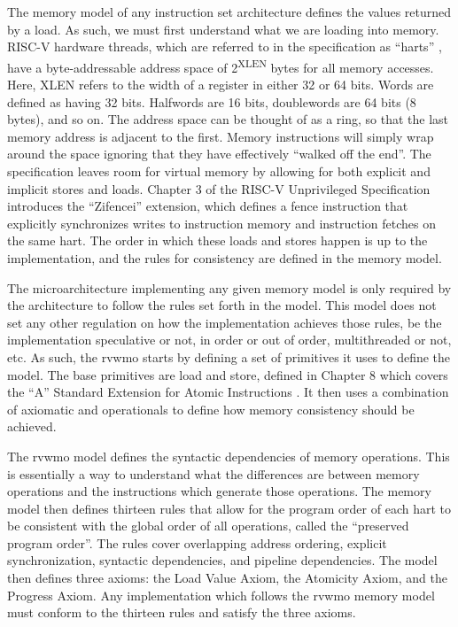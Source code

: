 The memory model of any instruction set architecture defines the values returned by a load. As such, we must first understand what we are loading into memory. RISC-V hardware threads, which are referred to in the specification as ``\glspl{hart}'' \cite{UnprivIsa2019}, have a byte-addressable address space of 2\textsuperscript{XLEN} bytes for all memory accesses. Here, XLEN refers to the width of a register in either 32 or 64 bits. Words are defined as having 32 bits. Halfwords are 16 bits, doublewords are 64 bits (8 bytes), and so on. The address space can be thought of as a ring, so that the last memory address is adjacent to the first. Memory instructions will simply wrap around the space ignoring that they have effectively ``walked off the end''. The specification leaves room for virtual memory by allowing for both explicit and implicit stores and loads. Chapter 3 of the RISC-V Unprivileged Specification \cite{UnprivIsa2019} introduces the ``Zifencei'' extension, which defines a fence instruction that explicitly synchronizes writes to instruction memory and instruction fetches on the same \gls{hart}. The order in which these loads and stores happen is up to the implementation, and the rules for consistency are defined in the memory model.

The microarchitecture implementing any given memory model is only required by the architecture to follow the rules set forth in the model. This model does not set any other regulation on how the implementation achieves those rules, be the implementation speculative or not, in order or out of order, multithreaded or not, etc. As such, the \gls{rvwmo} starts by defining a set of primitives it uses to define the model. The base primitives are load and store, defined in Chapter 8 which covers the ``A'' Standard Extension for Atomic Instructions \cite{UnprivIsa2019}. It then uses a combination of \gls{axiomatic} and \glspl{operational} to define how memory consistency should be achieved.

The \gls{rvwmo} model defines the syntactic dependencies of memory operations. This is essentially a way to understand what the differences are between memory operations and the instructions which generate those operations. The memory model then defines thirteen rules that allow for the program order of each \gls{hart} to be consistent with the global order of all operations, called the ``preserved program order''. The rules cover overlapping address ordering, explicit synchronization, syntactic dependencies, and pipeline dependencies. The model then defines three axioms: the Load Value Axiom, the Atomicity Axiom, and the Progress Axiom. Any implementation which follows the \gls{rvwmo} memory model must conform to the thirteen rules and satisfy the three axioms.

